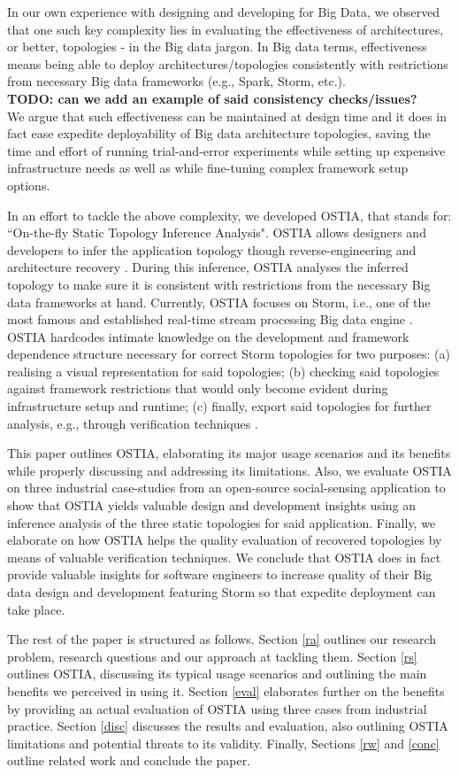 In our own experience with designing and developing for Big Data, we observed that one such key complexity lies in evaluating the effectiveness of architectures, or better, topologies - in the Big data jargon. In Big data terms, effectiveness means being able to deploy architectures/topologies consistently with restrictions from necessary Big data frameworks (e.g., Spark, Storm, etc.). \\
\textbf{TODO: can we add an example of said consistency checks/issues?} \\
We argue that such effectiveness can be maintained at design time and it does in fact ease expedite deployability of Big data architecture topologies, saving the time and effort of running trial-and-error experiments while setting up expensive infrastructure needs as well as while fine-tuning complex framework setup options.

In an effort to tackle the above complexity, we developed OSTIA, that stands for: ``On-the-fly Static Topology Inference Analysis". OSTIA allows designers and developers to infer the application topology though reverse-engineering and architecture recovery \cite{archrec}. During this inference, OSTIA analyses the inferred topology to make sure it is consistent with restrictions from the necessary Big data frameworks at hand. Currently, OSTIA focuses on Storm, i.e., one of the most famous and established real-time stream processing Big data engine \cite{storm}. OSTIA hardcodes intimate knowledge on the development and framework dependence structure necessary for correct Storm topologies for two purposes: (a) realising a visual representation for said topologies; (b) checking said topologies against framework restrictions that would only become evident during infrastructure setup and runtime; (c) finally, export said topologies for further analysis, e.g., through verification techniques \cite{marcello}.

This paper outlines OSTIA, elaborating its major usage scenarios and its benefits while properly discussing and addressing its limitations. Also, we evaluate OSTIA on three industrial case-studies from an open-source social-sensing application to show that OSTIA yields valuable design and development insights using an inference analysis of the three static topologies for said application. Finally, we elaborate on how OSTIA helps the quality evaluation of recovered topologies by means of valuable verification techniques. We conclude that OSTIA does in fact provide valuable insights for software engineers to increase quality of their Big data design and development featuring Storm so that expedite deployment can take place.

The rest of the paper is structured as follows. Section \ref{ra} outlines our research problem, research questions and our approach at tackling them. Section \ref{rs} outlines OSTIA, discussing its typical usage scenarios and outlining the main benefits we perceived in using it. Section \ref{eval} elaborates further on the benefits by providing an actual evaluation of OSTIA using three cases from industrial practice. Section \ref{disc} discusses the results and evaluation, also outlining OSTIA limitations and potential threats to its validity. Finally, Sections \ref{rw} and \ref{conc} outline related work and conclude the paper.